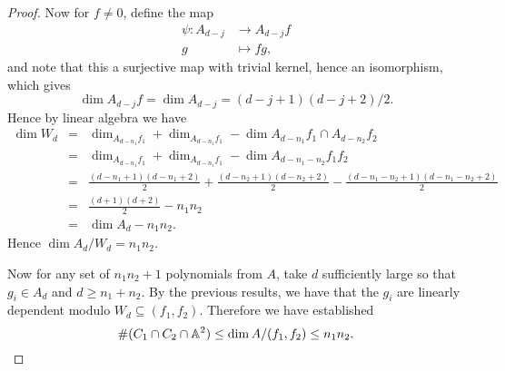\documentclass[10pt]{amsart}
\begin{document}
\begin{prop}
\begin{proof}
    Now for $f \neq 0$, define the map
    \begin{align*}
      \psi \colon A_{d-j} &\rightarrow A_{d-j}f\\
      g &\mapsto fg,
    \end{align*}
    and note that this a surjective map with trivial kernel, hence an isomorphism, which gives 
    $$\dim{A_{d-j}}f = \dim{A_{d-j}} = (d-j + 1)(d - j + 2)/2.$$
    Hence by linear algebra we have
    \begin{eqnarray*}
      \dim{W_d} &=& \dim_{A_{d - n_1}f_1} + \dim_{A_{d - n_1}f_1} - \dim{A_{d - n_1}f_1 \cap A_{d - n_2}f_2}\\
      &=& \dim_{A_{d - n_1}f_1} + \dim_{A_{d - n_1}f_1} - \dim{A_{d - n_1 - n_2}f_1f_2}\\
      &=& \frac{(d - n_1 + 1)(d - n_1 + 2)}{2} + \frac{(d - n_2 + 1)(d - n_2 + 2)}{2} - \frac{(d - n_1 - n_2 + 1)(d - n_1 - n_2 + 2)}{2}\\
      &=& \frac{(d + 1)(d + 2)}{2} - n_1n_2\\
      &=& \dim{A_d} - n_1n_2.
    \end{eqnarray*}
    Hence $\dim{A_d/W_d} = n_1n_2$.

    Now for any set of $n_1n_2 + 1$ polynomials from $A$, take $d$ sufficiently large so that $g_i \in A_d$ and $d \geq n_ 1 + n_2$.
    By the previous results, we have that the $g_i$ are linearly dependent modulo $W_d \subseteq (f_1, f_2)$.
    Therefore we have established
    $$\#(C_1 \cap C_2 \cap \mathbb{A}^2) \leq \dim A /(f_1,f_2) \leq n_1n_2.$$

  \end{proof}
\end{prop}
\end{document}
